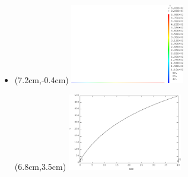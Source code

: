 \begin{frame}{}
  \begin{itemize}
    \item {}
    \begin{textblock*}{6cm}(7.2cm,-0.4cm)
      \includegraphics[width=5cm]{images/thermique_1d_axi.1}
    \end{textblock*}
    \begin{textblock*}{6cm}(6.8cm,3.5cm)
      \includegraphics[width=5cm]{images/thermique_1d_axi.2}
    \end{textblock*}
    
  \end{itemize}
  \vspace{1cm}
\end{frame}




